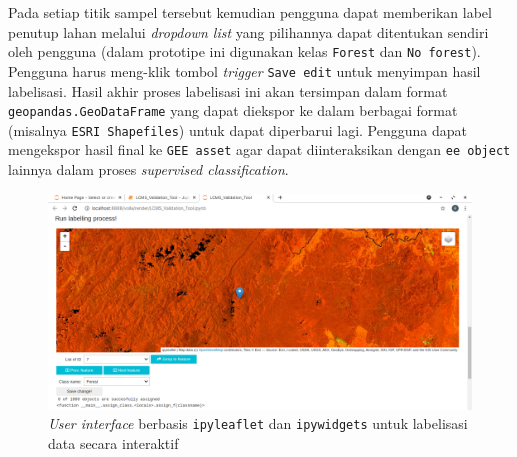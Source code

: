 \documentclass[a4paper,12pt]{article}
\begin{document}
Pada setiap titik sampel tersebut kemudian pengguna dapat memberikan label penutup lahan melalui \textit{dropdown list} yang pilihannya dapat ditentukan sendiri oleh pengguna (dalam prototipe ini digunakan kelas \texttt{Forest} dan \texttt{No forest}). Pengguna harus meng-klik tombol \textit{trigger} \texttt{Save edit} untuk menyimpan hasil labelisasi. Hasil akhir proses labelisasi ini akan tersimpan dalam format \texttt{geopandas.GeoDataFrame} yang dapat diekspor ke dalam berbagai format (misalnya \texttt{ESRI Shapefiles}) untuk dapat diperbarui lagi. Pengguna dapat mengekspor hasil final ke \texttt{GEE asset} agar dapat diinteraksikan dengan \texttt{ee object} lainnya dalam proses \textit{supervised classification}.

\begin{figure}
\centering
\includegraphics[width = \columnwidth]{ss_1.png}
\caption{\textit{User interface} berbasis \texttt{ipyleaflet} dan \texttt{ipywidgets} untuk labelisasi data secara interaktif}
\end{figure}




\newpage

\end{document}

